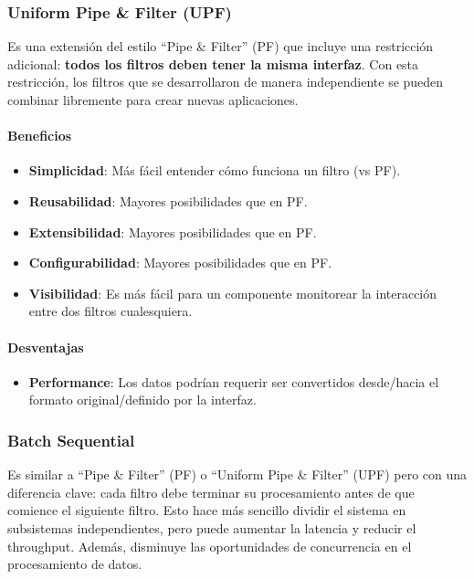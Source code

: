 \documentclass{article}
\begin{document}
			
			
			\subsubsection{Uniform Pipe \& Filter (UPF)}
			Es una extensión del estilo ``Pipe \& Filter'' (PF) que incluye una restricción adicional: \textbf{todos los filtros deben tener la misma interfaz}. Con esta restricción, los filtros que se desarrollaron de manera independiente se pueden combinar libremente para crear nuevas aplicaciones.
			
			\paragraph{Beneficios}
			\begin{itemize}	
				\item {\textbf{Simplicidad}}: Más fácil entender cómo funciona un filtro (vs PF).
				\item {\textbf{Reusabilidad}}: Mayores posibilidades que en PF.
				\item {\textbf{Extensibilidad}}: Mayores posibilidades que en PF.
				\item {\textbf{Configurabilidad}}: Mayores posibilidades que en PF.
				\item {\textbf{Visibilidad}}: Es más fácil para un componente monitorear la
				interacción entre dos filtros cualesquiera.
			\end{itemize}
			
			\paragraph{Desventajas}
			\begin{itemize}	
				
				\item {\textbf{Performance}}: Los datos podrían requerir ser convertidos desde/hacia el
				formato original/definido por la interfaz.
				
			\end{itemize}
			
			\subsubsection{Batch Sequential}
			
			Es similar a ``Pipe \& Filter'' (PF) o ``Uniform Pipe \& Filter'' (UPF) pero con una diferencia clave: cada filtro debe terminar su procesamiento antes de que comience el siguiente filtro. Esto hace más sencillo dividir el sistema en subsistemas independientes, pero puede aumentar la latencia y reducir el throughput. Además, disminuye las oportunidades de concurrencia en el procesamiento de datos. 
			
\end{document}
